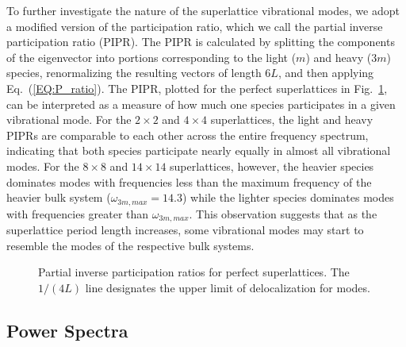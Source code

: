 \documentclass[aps,prb,preprint,preprintnumbers,amsmath,amssymb,floatfix,superscriptaddress]{revtex4}
\begin{document}
To further investigate the nature of the superlattice vibrational modes, we adopt a modified version of the participation ratio, which we call the partial inverse participation ratio (PIPR). The PIPR is calculated by splitting the components of the eigenvector into portions corresponding to the light ($m$) and heavy ($3m$) species, renormalizing the resulting vectors of length $6L$, and then applying Eq.~(\ref{EQ:P_ratio}). The PIPR, plotted for the perfect superlattices in Fig.~\ref{FIG:ipnum}, can be interpreted as a measure of how much one species participates in a given vibrational mode. For the $2 \times 2$ and $4 \times 4$ superlattices, the light and heavy PIPRs are comparable to each other across the entire frequency spectrum, indicating that both species participate nearly equally in almost all vibrational modes. For the $8 \times 8$ and $14 \times 14$ superlattices, however, the heavier species dominates modes with frequencies less than the maximum frequency of the heavier bulk system ($\omega_{3m,max}=14.3$) while the lighter species dominates modes with frequencies greater than $\omega_{3m,max}$. This observation suggests that as the superlattice period length increases, some vibrational modes may start to resemble the modes of the respective bulk systems. 
\begin{figure}[h!]
\begin{center}
\renewcommand{\figure}{Fig.}
\caption{Partial inverse participation ratios for perfect superlattices. The $1/(4L)$ line designates the upper limit of delocalization for modes.}
\label{FIG:ipnum}
\end{center}
\end{figure}

\subsection{Power Spectra}
\end{document}
